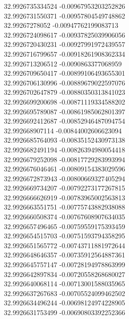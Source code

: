 {32.9926735334524	-0.00967953203252826\\
32.9926731550371	-0.00957804549748862\\
32.99267278052	-0.00947762199083713\\
32.9926724098617	-0.00937825039906056\\
32.9926720430231	-0.00927991972439557\\
32.9926716799657	-0.00918261908362334\\
32.9926713206512	-0.0090863377068959\\
32.9926709650417	-0.00899106493655301\\
32.9926706130996	-0.00889679022597076\\
32.9926702647879	-0.00880350313841023\\
32.9926699200698	-0.00871119334588202\\
32.9926695789087	-0.00861985062801397\\
32.9926692412687	-0.00852946487094754\\
32.992668907114	-0.00844002606623094\\
32.9926685764093	-0.00835152430973138\\
32.9926682491194	-0.00826394980054418\\
32.9926679252098	-0.00817729283993994\\
32.9926676046461	-0.00809154383029596\\
32.9926672873943	-0.00800669327405294\\
32.9926669734207	-0.00792273177267815\\
32.9926666626919	-0.00783965002563813\\
32.9926663551751	-0.00775743882938088\\
32.9926660508374	-0.00767608907634035\\
32.9926657496465	-0.00759559175393459\\
32.9926654515703	-0.00751593794358295\\
32.9926651565772	-0.00743711881972644\\
32.9926648646357	-0.00735912564887361\\
32.9926645757147	-0.00728194978863999\\
32.9926642897834	-0.00720558268680027\\
32.9926640068114	-0.00713001588035965\\
32.9926637267683	-0.00705524099462502\\
32.9926634496244	-0.00698124974228905\\
32.9926631753499	-0.00690803392252366\\
}

